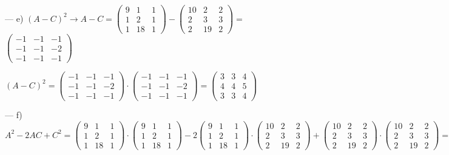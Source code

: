 \begin{proofw}
  
  \noindent --- e) $(A-C)^2 \to A-C= \left( \begin{matrix}  9&1&1\\1&2&1\\1&18&1 \end{matrix} \right)-\left( \begin{matrix} 10&2&2\\2&3&3\\2&19&2  \end{matrix} \right)=$
  $\left( \begin{matrix} -1&-1&-1\\-1&-1&-2\\-1&-1&-1  \end{matrix} \right)$
  
  \noindent $(A-C)^2=\left( \begin{matrix} -1&-1&-1\\-1&-1&-2\\-1&-1&-1  \end{matrix} \right) \cdot \left( \begin{matrix} -1&-1&-1\\-1&-1&-2\\-1&-1&-1  \end{matrix} \right)=
  \left( \begin{matrix} 3 & 3& 4\\4 & 4& 5\\ 3& 3& 4  \end{matrix} \right)$

\noindent --- f) $A^2-2AC+C^2= 
\left( \begin{matrix}  9&1&1\\1&2&1\\1&18&1 \end{matrix} \right)\cdot \left( \begin{matrix}  9&1&1\\1&2&1\\1&18&1 \end{matrix} \right)
-2\left( \begin{matrix}  9&1&1\\1&2&1\\1&18&1 \end{matrix} \right)\cdot
\left( \begin{matrix} 10&2&2\\2&3&3\\2&19&2  \end{matrix} \right)+
\left( \begin{matrix} 10&2&2\\2&3&3\\2&19&2  \end{matrix} \right)\cdot \left( \begin{matrix} 10&2&2\\2&3&3\\2&19&2  \end{matrix} \right)=\cdots = 
\left( \begin{matrix}  3&13&-5\\10&20&2\\-6&4&-14 \end{matrix} \right)\neq (A-C)^2$

\end{proofw}

